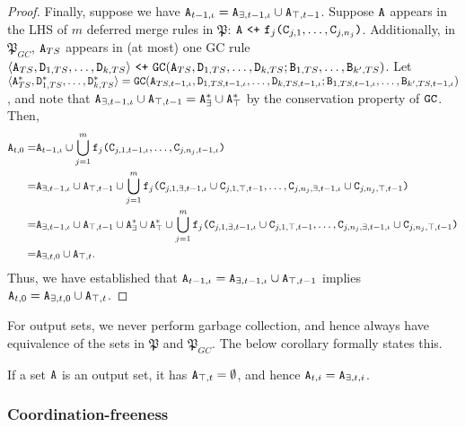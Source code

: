 \begin{proof}
Finally, suppose we have $\tt{A}_{t-1,\iota} = \tt{A}_{\exists,t-1,\iota} \cup \tt{A}_{\top,t-1}$.
Suppose $\tt{A}$ appears in the LHS of $m$ deferred merge rules in $\mathfrak{P}$: $\tt{A} ~\tt{<+}~ \tt{f}_j\tt{(}\tt{C}_{j,1},\dots,\tt{C}_{j,n_j}\tt{)}$.
Additionally, in $\mathfrak{P}_{GC}$, $\tt{A}_{TS}$ appears in (at most) one GC rule $\langle \tt{A}_{TS}, \tt{D}_{1,TS}, \dots, \tt{D}_{k,TS} \rangle ~\tt{<+}~ \tt{GC}(\tt{A}_{TS}, \tt{D}_{1,TS}, \dots, \tt{D}_{k,TS}; \tt{B}_{1,TS}, \dots, \tt{B}_{k',TS})$.
Let $\langle \tt{A}_{TS}^*, \tt{D}_{1,TS}^*, \dots, \tt{D}_{k,TS}^* \rangle = \tt{GC}(\tt{A}_{TS,t-1,\iota}, \tt{D}_{1,TS,t-1,\iota}, \dots, \tt{D}_{k,TS,t-1,\iota}; \tt{B}_{1,TS,t-1,\iota}, \dots, \tt{B}_{k',TS,t-1,\iota})$, and note that $\tt{A}_{\exists,t-1,\iota} \cup \tt{A}_{\top,t-1} = \tt{A}_{\exists}^* \cup \tt{A}_{\top}^*$ by the conservation property of $\tt{GC}$.
Then,
\begin{align*}
\tt{A}_{t,0}
=& \tt{A}_{t-1,\iota} \cup \bigcup_{j=1}^m \tt{f}_j\tt{(}\tt{C}_{j,1,t-1,\iota},\dots,\tt{C}_{j,n_j,t-1,\iota}\tt{)}\\
=& \tt{A}_{\exists,t-1,\iota} \cup \tt{A}_{\top,t-1}
\cup \bigcup_{j=1}^m \tt{f}_j\tt{(}\tt{C}_{j,1,\exists,t-1,\iota} \cup \tt{C}_{j,1,\top,t-1}, \dots, \tt{C}_{j,n_j,\exists,t-1,\iota} \cup \tt{C}_{j,n_j,\top,t-1}\tt{)}\\
=& \tt{A}_{\exists,t-1,\iota} \cup \tt{A}_{\top,t-1}
\cup \tt{A}_{\exists}^* \cup \tt{A}_{\top}^*
\cup \bigcup_{j=1}^m \tt{f}_j\tt{(}\tt{C}_{j,1,\exists,t-1,\iota} \cup \tt{C}_{j,1,\top,t-1}, \dots, \tt{C}_{j,n_j,\exists,t-1,\iota} \cup \tt{C}_{j,n_j,\top,t-1}\tt{)}\\
=& \tt{A}_{\exists,t,0} \cup \tt{A}_{\top,t}.
\end{align*}
Thus, we have established that $\tt{A}_{t-1,\iota} = \tt{A}_{\exists,t-1,\iota} \cup \tt{A}_{\top,t-1}$ implies $\tt{A}_{t,0} = \tt{A}_{\exists,t,0} \cup \tt{A}_{\top,t}$.
\end{proof}

For output sets, we never perform garbage collection, and hence always have equivalence of the sets in $\mathfrak{P}$ and $\mathfrak{P}_{GC}$.
The below corollary formally states this.
\begin{cor}
\label{cor:equivalence_of_output}
If a set $\tt{A}$ is an output set, it has $\tt{A}_{\top,t} = \emptyset$, and hence $\tt{A}_{t,i} = \tt{A}_{\exists,t,i}$.
\end{cor}



\subsubsection{Coordination-freeness}

